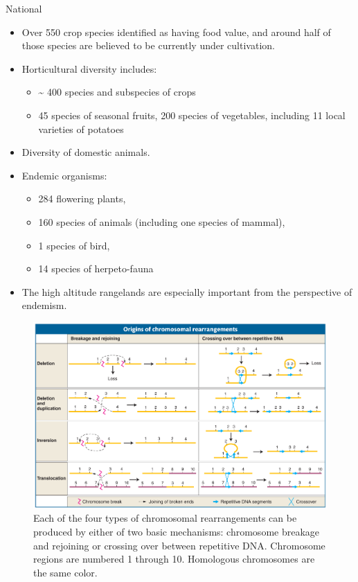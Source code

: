 \documentclass[ignorenonframetext,aspectratio=169]{beamer}
\providecommand{\tightlist}{%
  \setlength{\itemsep}{0pt}\setlength{\parskip}{0pt}}
\begin{document}
\begin{frame}{National}
\protect\hypertarget{national-3}{}

\begin{itemize}
\tightlist
\item
  Over 550 crop species identified as having food value, and around half
  of those species are believed to be currently under cultivation.
\item
  Horticultural diversity includes:

  \begin{itemize}
  \tightlist
  \item
    \textasciitilde{} 400 species and subspecies of crops
  \item
    45 species of seasonal fruits, 200 species of vegetables, including
    11 local varieties of potatoes
  \end{itemize}
\item
  Diversity of domestic animals.
\item
  Endemic organisms:

  \begin{itemize}
  \tightlist
  \item
    284 flowering plants,
  \item
    160 species of animals (including one species of mammal),
  \item
    1 species of bird,
  \item
    14 species of herpeto-fauna
  \end{itemize}
\item
  The high altitude rangelands are especially important from the
  perspective of endemism.
\end{itemize}

\end{frame}

\begin{frame}{}
\protect\hypertarget{section-4}{}

\begin{figure}
\includegraphics[width=0.65\linewidth]{./../images/genetic_variation_chromosome_mutation} \caption{Each of the four types of chromosomal rearrangements can be produced by either of two basic mechanisms: chromosome breakage and rejoining or crossing over between repetitive DNA. Chromosome regions are numbered 1 through 10. Homologous chromosomes are the same color.}\label{fig:genetic-variation}
\end{figure}

\end{frame}
\end{document}
